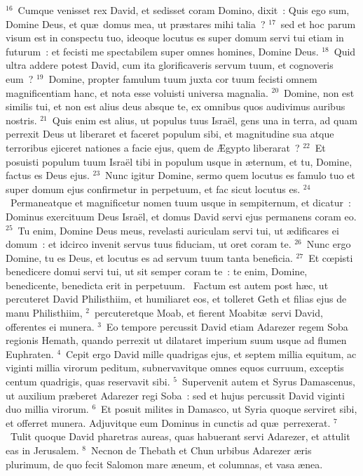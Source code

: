 ${}^{16}$~Cumque venisset rex David, et sedisset coram Domino, dixit~: Quis ego sum, Domine Deus, et qu\ae\ domus mea, ut pr\ae stares mihi talia~?
${}^{17}$~sed et hoc parum visum est in conspectu tuo, ideoque locutus es super domum servi tui etiam in futurum~: et fecisti me spectabilem super omnes homines, Domine Deus.
${}^{18}$~Quid ultra addere potest David, cum ita glorificaveris servum tuum, et cognoveris eum~?
${}^{19}$~Domine, propter famulum tuum juxta cor tuum fecisti omnem magnificentiam hanc, et nota esse voluisti universa magnalia.
${}^{20}$~Domine, non est similis tui, et non est alius deus absque te, ex omnibus quos audivimus auribus nostris.
${}^{21}$~Quis enim est alius, ut populus tuus Isra\"el, gens una in terra, ad quam perrexit Deus ut liberaret et faceret populum sibi, et magnitudine sua atque terroribus ejiceret nationes a facie ejus, quem de \AE gypto liberarat~?
${}^{22}$~Et posuisti populum tuum Isra\"el tibi in populum usque in \ae ternum, et tu, Domine, factus es Deus ejus.
${}^{23}$~Nunc igitur Domine, sermo quem locutus es famulo tuo et super domum ejus confirmetur in perpetuum, et fac sicut locutus es.
${}^{24}$~Permaneatque et magnificetur nomen tuum usque in sempiternum, et dicatur~: Dominus exercituum Deus Isra\"el, et domus David servi ejus permanens coram eo.
${}^{25}$~Tu enim, Domine Deus meus, revelasti auriculam servi tui, ut \ae dificares ei domum~: et idcirco invenit servus tuus fiduciam, ut oret coram te.
${}^{26}$~Nunc ergo Domine, tu es Deus, et locutus es ad servum tuum tanta beneficia.
${}^{27}$~Et cœpisti benedicere domui servi tui, ut sit semper coram te~: te enim, Domine, benedicente, benedicta erit in perpetuum.
~Factum est autem post h\ae c, ut percuteret David Philisthiim, et humiliaret eos, et tolleret Geth et filias ejus de manu Philisthiim,
${}^{2}$~percuteretque Moab, et fierent Moabit\ae\ servi David, offerentes ei munera.
${}^{3}$~Eo tempore percussit David etiam Adarezer regem Soba regionis Hemath, quando perrexit ut dilataret imperium suum usque ad flumen Euphraten.
${}^{4}$~Cepit ergo David mille quadrigas ejus, et septem millia equitum, ac viginti millia virorum peditum, subnervavitque omnes equos curruum, exceptis centum quadrigis, quas reservavit sibi.
${}^{5}$~Supervenit autem et Syrus Damascenus, ut auxilium pr\ae beret Adarezer regi Soba~: sed et hujus percussit David viginti duo millia virorum.
${}^{6}$~Et posuit milites in Damasco, ut Syria quoque serviret sibi, et offerret munera. Adjuvitque eum Dominus in cunctis ad qu\ae\ perrexerat.
${}^{7}$~Tulit quoque David pharetras aureas, quas habuerant servi Adarezer, et attulit eas in Jerusalem.
${}^{8}$~Necnon de Thebath et Chun urbibus Adarezer \ae ris plurimum, de quo fecit Salomon mare \ae neum, et columnas, et vasa \ae nea.


